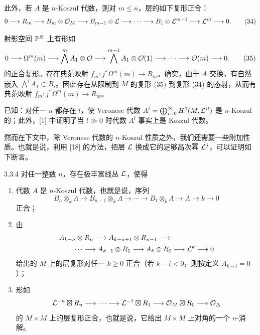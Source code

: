 此外，若 $A$ 是 $n$-Koszul 代数，则对 $m\leqslant n$，层的如下复形正合：
\begin{equation}
0\longrightarrow R_{m}\longrightarrow B_{m}\otimes\mathcal{O}_{M}\longrightarrow B_{m-1}\otimes\mathcal{L}\longrightarrow\cdots\longrightarrow B_{1}\otimes\mathcal{L}^{m-1}\longrightarrow\mathcal{L}^{m}\longrightarrow0.
\tag{34}
\end{equation}

射影空间 $\mathbb{P}^{N}$ 上有形如
\begin{equation}
0\longrightarrow\Omega^{m}(m)\longrightarrow\bigwedge^{m}A_{1}\otimes\mathcal{O}\longrightarrow\bigwedge^{m-1}A_{1}\otimes\mathcal{O}(1)\longrightarrow\cdots\longrightarrow\mathcal{O}(m)\longrightarrow0.
\tag{35}
\end{equation}
的正合复形。存在典范映射 $f_{m}:j^{*}\Omega^{m}(m)\to R_{m}$。确实，由于 $A$ 交换，有自然嵌入 $\bigwedge^{i}A_{1}\subset B_{i}$。因此存在从限制到 $M$ 的复形 (35) 到复形 (34) 的态射，从而有典范映射 $f_{m}:j^{*}\Omega^{m}(m)\to R_{m}$。

已知：对任一 $n$ 都存在 $l$，使 Veronese 代数 $A^{l}=\bigoplus_{i=0}^{\infty}H^{0}(M,\mathcal{L}^{il})$ 是 $n$-Koszul 的；此外，[1] 中证明了当 $l\gg0$ 时代数 $A^{l}$ 事实上是 Koszul 代数。

然而在下文中，除 Veronese 代数的 $n$-Koszul 性质之外，我们还需要一些附加性质。也就是说，利用 [18] 的方法，把层 $\mathcal{L}$ 换成它的足够高次幂 $\mathcal{L}^{j}$，可以证明如下断言。

\begin{proposition}{3.3.4}
对任一整数 $n$，存在极丰富线丛 $\mathcal{L}$，使得
\begin{enumerate}[label=\arabic*),leftmargin=2.6em,itemsep=2pt,topsep=2pt]
\item 代数 $A$ 是 $n$-Koszul 代数，也就是说，序列
\begin{equation*}
B_{n}\otimes_{k}A\longrightarrow B_{n-1}\otimes_{k}A\longrightarrow\cdots\longrightarrow B_{1}\otimes_{k}A\longrightarrow A\longrightarrow k\longrightarrow0
\end{equation*}
正合；
\item 由
\begin{align*}
&A_{k-n}\otimes R_{n}\longrightarrow A_{k-n+1}\otimes R_{n-1}\longrightarrow\\
&\qquad\cdots\longrightarrow A_{k-1}\otimes R_{1}\longrightarrow A_{k}\otimes R_{0}\longrightarrow\mathcal{L}^{k}\longrightarrow0
\end{align*}
给出的 $M$ 上的层复形对任一 $k\geqslant0$ 正合（若 $k-i<0$，则按定义 $A_{k-i}=0$）；
\item 形如
\begin{equation*}
\mathcal{L}^{-n}\boxtimes R_{n}\longrightarrow\cdots\longrightarrow\mathcal{L}^{-1}\boxtimes R_{1}\longrightarrow\mathcal{O}_{M}\boxtimes R_{0}\longrightarrow\mathcal{O}_{\Delta}
\end{equation*}
的 $M\times M$ 上的层复形正合，也就是说，它给出 $M\times M$ 上对角的一个 $n$-消解。
\end{enumerate}
\end{proposition}

